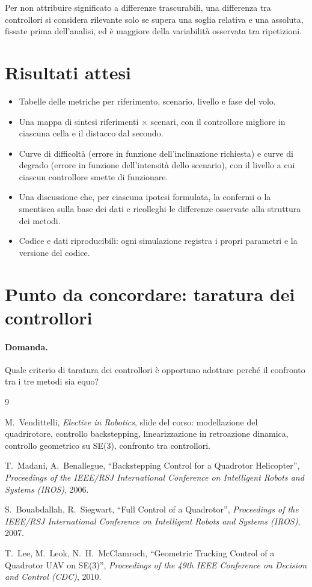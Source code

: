 \documentclass[11pt,a4paper]{article}
\begin{document}
Per non attribuire significato a differenze trascurabili, una differenza tra controllori si considera rilevante solo se supera una soglia relativa e una assoluta, fissate prima dell'analisi, ed è maggiore della variabilità osservata tra ripetizioni.

\section{Risultati attesi}

\begin{itemize}
  \item Tabelle delle metriche per riferimento, scenario, livello e fase del volo.
  \item Una mappa di sintesi riferimenti $\times$ scenari, con il controllore migliore in ciascuna cella e il distacco dal secondo.
  \item Curve di difficoltà (errore in funzione dell'inclinazione richiesta) e curve di degrado (errore in funzione dell'intensità dello scenario), con il livello a cui ciascun controllore smette di funzionare.
  \item Una discussione che, per ciascuna ipotesi formulata, la confermi o la smentisca sulla base dei dati e ricolleghi le differenze osservate alla struttura dei metodi.
  \item Codice e dati riproducibili: ogni simulazione registra i propri parametri e la versione del codice.
\end{itemize}

\section{Punto da concordare: taratura dei controllori}\label{sec:taratura}

\paragraph{Domanda.} Quale criterio di taratura dei controllori è opportuno adottare perché il confronto tra i tre metodi sia equo?

\begin{thebibliography}{9}

M.~Vendittelli, \emph{Elective in Robotics}, slide del corso: modellazione del quadrirotore, controllo backstepping, linearizzazione in retroazione dinamica, controllo geometrico su SE(3), confronto tra controllori.

T.~Madani, A.~Benallegue, ``Backstepping Control for a Quadrotor Helicopter'', \emph{Proceedings of the IEEE/RSJ International Conference on Intelligent Robots and Systems (IROS)}, 2006.

S.~Bouabdallah, R.~Siegwart, ``Full Control of a Quadrotor'', \emph{Proceedings of the IEEE/RSJ International Conference on Intelligent Robots and Systems (IROS)}, 2007.

T.~Lee, M.~Leok, N.~H.~McClamroch, ``Geometric Tracking Control of a Quadrotor UAV on SE(3)'', \emph{Proceedings of the 49th IEEE Conference on Decision and Control (CDC)}, 2010.
\end{thebibliography}
\end{document}
